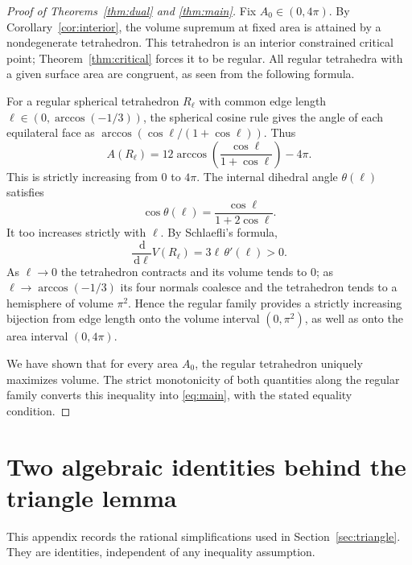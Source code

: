 \documentclass[11pt,reqno]{amsart}
\theoremstyle{remark}
\newcommand{\dd}{\,\mathrm d}
\begin{document}
\begin{proof}[Proof of Theorems~\ref{thm:dual} and \ref{thm:main}]
Fix $A_0\in(0,4\pi)$. By Corollary~\ref{cor:interior}, the volume supremum at fixed area is attained by a nondegenerate tetrahedron. This tetrahedron is an interior constrained critical point; Theorem~\ref{thm:critical} forces it to be regular. All regular tetrahedra with a given surface area are congruent, as seen from the following formula.

For a regular spherical tetrahedron $R_\ell$ with common edge length $\ell\in(0,\arccos(-1/3))$, the spherical cosine rule gives the angle of each equilateral face as $\arccos(\cos\ell/(1+\cos\ell))$. Thus
\begin{equation}\label{eq:regular-area}
 A(R_\ell)=12\arccos\!\left(\frac{\cos\ell}{1+\cos\ell}\right)-4\pi.
\end{equation}
This is strictly increasing from $0$ to $4\pi$. The internal dihedral angle $\theta(\ell)$ satisfies
\begin{equation}\label{eq:regular-dihedral}
 \cos\theta(\ell)=\frac{\cos\ell}{1+2\cos\ell}.
\end{equation}
It too increases strictly with $\ell$. By Schlaefli's formula,
\[
 \frac{\dd}{\dd\ell}V(R_\ell)=3\ell\,\theta'(\ell)>0.
\]
As $\ell\to0$ the tetrahedron contracts and its volume tends to $0$; as $\ell\to\arccos(-1/3)$ its four normals coalesce and the tetrahedron tends to a hemisphere of volume $\pi^2$. Hence the regular family provides a strictly increasing bijection from edge length onto the volume interval $(0,\pi^2)$, as well as onto the area interval $(0,4\pi)$.

We have shown that for every area $A_0$, the regular tetrahedron uniquely maximizes volume. The strict monotonicity of both quantities along the regular family converts this inequality into \eqref{eq:main}, with the stated equality condition.
\end{proof}

\appendix
\section{Two algebraic identities behind the triangle lemma}\label{sec:algebra}

This appendix records the rational simplifications used in Section~\ref{sec:triangle}. They are identities, independent of any inequality assumption.
\end{document}
